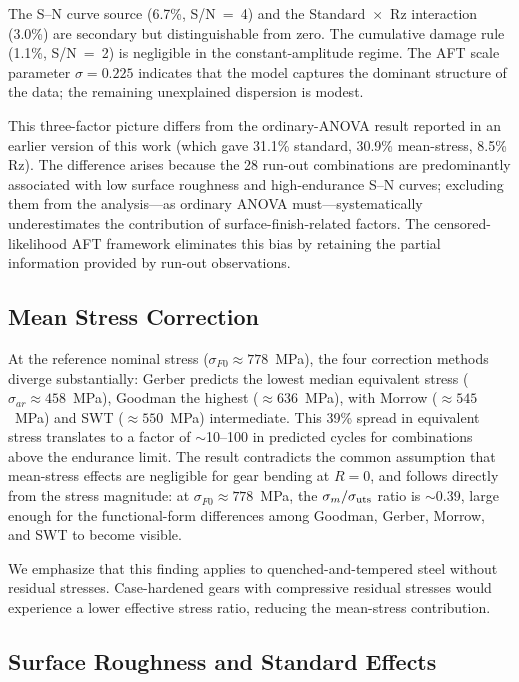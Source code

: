 \documentclass[12pt,a4paper]{article}
\begin{document}
The S--N curve source (6.7\%, S/N~=~4) and the
Standard~$\times$~Rz interaction (3.0\%) are secondary but
distinguishable from zero. The cumulative damage rule (1.1\%,
S/N~=~2) is negligible in the constant-amplitude regime. The
AFT scale parameter $\sigma = 0.225$ indicates that the model
captures the dominant structure of the data; the remaining
unexplained dispersion is modest.

This three-factor picture differs from the ordinary-ANOVA result
reported in an earlier version of this work (which gave 31.1\%
standard, 30.9\% mean-stress, 8.5\% Rz). The difference arises
because the 28 run-out combinations are predominantly associated
with low surface roughness and high-endurance S--N curves; excluding
them from the analysis---as ordinary ANOVA must---systematically
underestimates the contribution of surface-finish-related factors.
The censored-likelihood AFT framework eliminates this bias by
retaining the partial information provided by run-out observations.

\subsection{Mean Stress Correction}

At the reference nominal stress ($\sigma_{F0} \approx 778$~MPa), the
four correction methods diverge substantially: Gerber predicts the
lowest median equivalent stress ($\sigma_{ar} \approx 458$~MPa),
Goodman the highest ($\approx 636$~MPa), with Morrow ($\approx 545$~MPa)
and SWT ($\approx 550$~MPa) intermediate. This 39\% spread in
equivalent stress translates to a factor of $\sim$10--100 in predicted
cycles for combinations above the endurance limit. The result contradicts
the common assumption that mean-stress effects are negligible for gear
bending at $R=0$, and follows directly from the stress magnitude: at
$\sigma_{F0} \approx 778$~MPa, the $\sigma_m/\sigma_{\rm uts}$ ratio
is $\sim$0.39, large enough for the functional-form differences among
Goodman, Gerber, Morrow, and SWT to become visible.

We emphasize that this finding applies to quenched-and-tempered steel
without residual stresses. Case-hardened gears with compressive residual
stresses would experience a lower effective stress ratio, reducing the
mean-stress contribution.

\subsection{Surface Roughness and Standard Effects}
\end{document}
